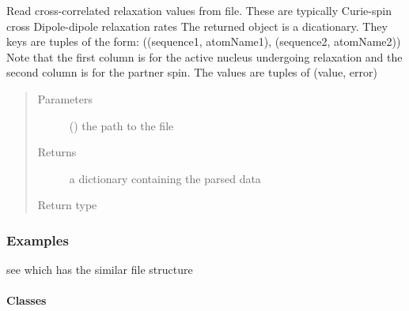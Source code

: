 \documentclass[a4paper,10pt,english]{sphinxmanual}
\begin{document}
\begin{fulllineitems}
\label{\detokenize{reference/generated/paramagpy.dataparse.read_ccr:paramagpy.dataparse.read_ccr}}
Read cross-correlated relaxation values from file.
These are typically Curie-spin cross Dipole-dipole relaxation rates
The returned object is a dicationary.
They keys are tuples of the form:
((sequence1, atomName1), (sequence2, atomName2))
Note that the first column is for the active nucleus undergoing
relaxation and the second column is for the partner spin.
The values are tuples of (value, error)
\begin{quote}\begin{description}
\item[{Parameters}] \leavevmode
{} () \textendash{} the path to the file

\item[{Returns}] \leavevmode
{} \textendash{} a dictionary containing the parsed data

\item[{Return type}] \leavevmode
{\hyperref[\detokenize{reference/generated/paramagpy.dataparse.DataContainer:paramagpy.dataparse.DataContainer}]{}}

\end{description}\end{quote}
\subsubsection*{Examples}

see {\hyperref[\detokenize{reference/generated/paramagpy.dataparse.read_rdc:paramagpy.dataparse.read_rdc}]{}} which has the similar file structure

\end{fulllineitems}



\paragraph{Classes}
\label{\detokenize{reference/dataparse:classes}}
\end{document}
